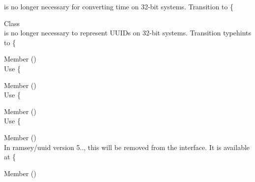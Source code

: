 \begin{DoxyRefList}
 is no longer necessary for converting time on 32-\/bit systems. Transition to \{ 
\item[Class \doxylink{class_ramsey_1_1_uuid_1_1_degraded_uuid}{Ramsey\textbackslash{}Uuid\textbackslash{}Degraded\+Uuid} ]\hfill \\
\label{deprecated__deprecated000272}%
%
 is no longer necessary to represent UUIDs on 32-\/bit systems. Transition typehints to \{ 
\item[Member \doxylink{interface_ramsey_1_1_uuid_1_1_deprecated_uuid_interface_a6b9d779f3a75ef7c461a13200fe19905}{Ramsey\textbackslash{}Uuid\textbackslash{}Deprecated\+Uuid\+Interface\+::get\+Clock\+Seq\+Hi\+And\+Reserved\+Hex} ()]\hfill \\
\label{deprecated__deprecated000275}%
%
Use \{ 
\item[Member \doxylink{interface_ramsey_1_1_uuid_1_1_deprecated_uuid_interface_ac762b2d746f73c3387c655864e1bbd4a}{Ramsey\textbackslash{}Uuid\textbackslash{}Deprecated\+Uuid\+Interface\+::get\+Clock\+Seq\+Low\+Hex} ()]\hfill \\
\label{deprecated__deprecated000276}%
%
Use \{ 
\item[Member \doxylink{interface_ramsey_1_1_uuid_1_1_deprecated_uuid_interface_afa20bdf1c96afb75c4930c07d36c9971}{Ramsey\textbackslash{}Uuid\textbackslash{}Deprecated\+Uuid\+Interface\+::get\+Clock\+Sequence\+Hex} ()]\hfill \\
\label{deprecated__deprecated000277}%
%
Use \{ 
\item[Member \doxylink{interface_ramsey_1_1_uuid_1_1_deprecated_uuid_interface_a6d12bd979a25c9beb3e620219577f4da}{Ramsey\textbackslash{}Uuid\textbackslash{}Deprecated\+Uuid\+Interface\+::get\+Date\+Time} ()]\hfill \\
\label{deprecated__deprecated000278}%
%
In ramsey/uuid version 5.., this will be removed from the interface. It is available at \{ 
\item[Member \doxylink{interface_ramsey_1_1_uuid_1_1_deprecated_uuid_interface_ad2fd44a994e08d23679fcacc0f7e2e50}{Ramsey\textbackslash{}Uuid\textbackslash{}Deprecated\+Uuid\+Interface\+::get\+Fields\+Hex} ()]\hfill \\

\end{DoxyRefList}
